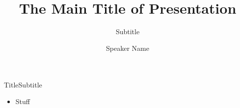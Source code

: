 \documentclass{beamer}%
\title{The Main Title of Presentation}
\subtitle{Subtitle}
\author{Speaker Name}
\institute{SciLifeLab Data Centre}
\date{}
\begin{document}
 \begin{frame}
  \maketitle
 \end{frame}
 
\begin{frame}{Title}{Subtitle}
 \begin{itemize}
  \item Stuff
 \end{itemize}
\end{frame}
\end{document}

